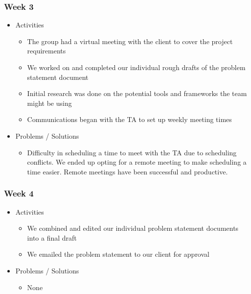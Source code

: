 \subsubsection{Week 3}
\begin{itemize}
\item Activities
  \begin{itemize}
  \item The group had a virtual meeting with the client to cover the project requirements
  \item We worked on and completed our individual rough drafts of the problem statement document
  \item Initial research was done on the potential tools and frameworks the team might be using
  \item Communications began with the TA to set up weekly meeting times
  \end{itemize}
  
\item Problems / Solutions
  \begin{itemize}
  \item Difficulty in scheduling a time to meet with the TA due to scheduling conflicts.
  We ended up opting for a remote meeting to make scheduling a time easier.
  Remote meetings have been successful and productive.
  \end{itemize}
\end{itemize}


\subsubsection{Week 4}
\begin{itemize}
\item Activities
  \begin{itemize}
  \item We combined and edited our individual problem statement documents into a final draft
  \item We emailed the problem statement to our client for approval
  \end{itemize}
  
\item Problems / Solutions
  \begin{itemize}
  \item None
  \end{itemize}
\end{itemize}


